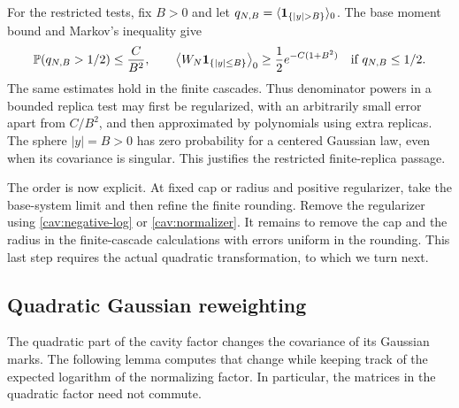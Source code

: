 For the restricted tests, fix $B>0$ and let
$q_{N,B}=\langle\ind_{\{|y|>B\}}\rangle_0$.  The base moment bound
and Markov's inequality give
\begin{equation}\label{cav:normalizer}
 \mathbb P(q_{N,B}>1/2)\le\frac{C}{B^2},
 \qquad
 \big\langle W_N\mathbf 1_{\{|y|\le B\}}\big\rangle_0
 \ge\frac12e^{-C(1+B^2)}
 \quad\text{if }q_{N,B}\le1/2.
\end{equation}
The same estimates hold in the finite cascades.  Thus denominator
powers in a bounded replica test may first be regularized, with an
arbitrarily small error apart from $C/B^2$, and then approximated by
polynomials using extra replicas.  The sphere $|y|=B>0$ has zero
probability for a centered Gaussian law, even when its covariance is
singular.  This justifies the restricted finite-replica passage.

The order is now explicit.  At fixed cap or radius and positive
regularizer, take the base-system limit and then refine the finite
rounding.  Remove the regularizer using
\eqref{cav:negative-log} or \eqref{cav:normalizer}.  It remains to
remove the cap and the radius in the finite-cascade calculations with
errors uniform in the rounding.  This last step requires the actual
quadratic transformation, to which we turn next.

\subsection{Quadratic Gaussian reweighting}

The quadratic part of the cavity factor changes the covariance of its
Gaussian marks.  The following lemma computes that change while keeping
track of the expected logarithm of the normalizing factor.  In particular,
the matrices in the quadratic factor need not commute.


